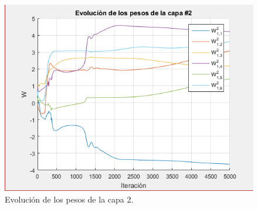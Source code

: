 \begin{figure}[H]
    \begin{center}
        \includegraphics[width=12cm]{1/pesos2.png}
        \caption{Evolución de los pesos de la capa 2.}
        \label{fig:pesos2}
    \end{center}
\end{figure}

